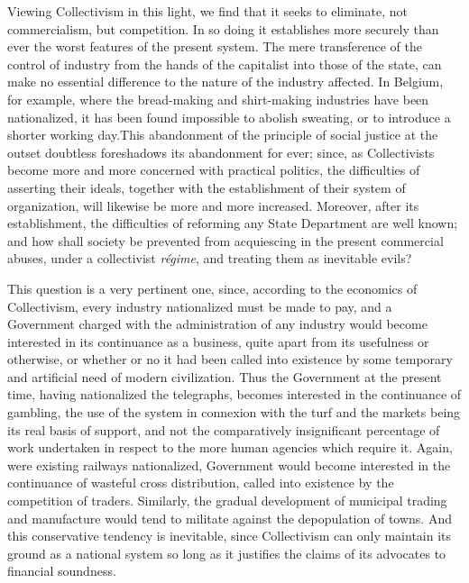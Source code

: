 \documentclass{book}
\begin{document}
Viewing Collectivism in this light, we find that it seeks to eliminate, not commercialism, but competition. In so doing it establishes more securely than ever the worst features of the present system. The mere transference of the control of industry from the hands of the capitalist into those of the state, can make no essential difference to the nature of the industry affected. In Belgium, for example, where the bread-making and shirt-making industries have been nationalized, it has been found impossible to abolish sweating, or to introduce a shorter working day.\footnotemark[2] This abandonment of the principle of social justice at the outset doubtless foreshadows its abandonment for ever; since, as Collectivists become more and more concerned with practical politics, the difficulties of asserting their ideals, together with the establishment of their system of organization, will likewise be more and more increased. Moreover, after its establishment, the difficulties of reforming any State Department are well known; and how shall society be prevented from acquiescing in the present commercial abuses, under a collectivist \emph{régime}, and treating them as inevitable evils?

This question is a very pertinent one, since, according to the economics of Collectivism, every industry nationalized must be made to pay, and a Government charged with the administration of any industry would become interested in its continuance as a business, quite apart from its usefulness or otherwise, or whether or no it had been called into existence by some temporary and artificial need of modern civilization. Thus the Government at the present time, having nationalized the telegraphs, becomes interested in the continuance of gambling, the use of the system in connexion with the turf and the markets being its real basis of support, and not the comparatively insignificant percentage of work undertaken in respect to the more human agencies which require it. Again, were existing railways nationalized, Government would become interested in the continuance of wasteful cross distribution, called into existence by the competition of traders. Similarly, the gradual development of municipal trading and manufacture would tend to militate against the depopulation of towns. And this conservative tendency is inevitable, since Collectivism can only maintain its ground as a national system so long as it justifies the claims of its advocates to financial soundness.
\end{document}
